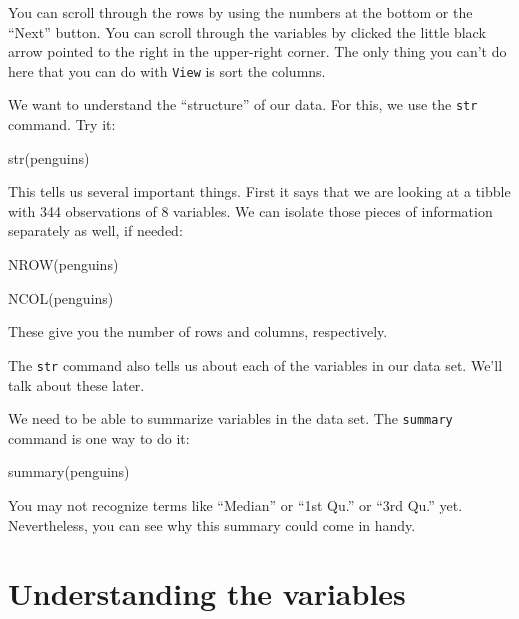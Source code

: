 \documentclass[
]{book}
\newenvironment{Shaded}{\begin{snugshade}}{\end{snugshade}}
\newcommand{\FunctionTok}[1]{\textcolor[rgb]{0.00,0.00,0.00}{#1}}
\newcommand{\NormalTok}[1]{#1}
\begin{document}
You can scroll through the rows by using the numbers at the bottom or the ``Next'' button. You can scroll through the variables by clicked the little black arrow pointed to the right in the upper-right corner. The only thing you can't do here that you can do with \texttt{View} is sort the columns.

We want to understand the ``structure'' of our data. For this, we use the \texttt{str} command. Try it:

\begin{Shaded}
\begin{Highlighting}[]
\FunctionTok{str}\NormalTok{(penguins)}
\end{Highlighting}
\end{Shaded}

This tells us several important things. First it says that we are looking at a tibble with 344 observations of 8 variables. We can isolate those pieces of information separately as well, if needed:

\begin{Shaded}
\begin{Highlighting}[]
\FunctionTok{NROW}\NormalTok{(penguins)}
\end{Highlighting}
\end{Shaded}

\begin{Shaded}
\begin{Highlighting}[]
\FunctionTok{NCOL}\NormalTok{(penguins)}
\end{Highlighting}
\end{Shaded}

These give you the number of rows and columns, respectively.

The \texttt{str} command also tells us about each of the variables in our data set. We'll talk about these later.

We need to be able to summarize variables in the data set. The \texttt{summary} command is one way to do it:

\begin{Shaded}
\begin{Highlighting}[]
\FunctionTok{summary}\NormalTok{(penguins)}
\end{Highlighting}
\end{Shaded}

You may not recognize terms like ``Median'' or ``1st Qu.'' or ``3rd Qu.'' yet. Nevertheless, you can see why this summary could come in handy.

\hypertarget{intror-understandingvariables}{%
\section{Understanding the variables}\label{intror-understandingvariables}}
\end{document}
